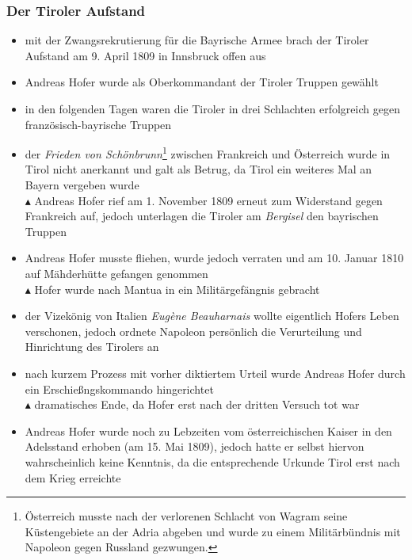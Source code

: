 \documentclass[11pt,a4paper]{article}
\begin{document}
\subsubsection*{\color{bluecolor} Der Tiroler Aufstand}

\begin{itemize}

\item mit der Zwangsrekrutierung für die Bayrische Armee brach der Tiroler Aufstand am 9. April 1809 in Innsbruck offen aus

\item Andreas Hofer wurde als Oberkommandant der Tiroler Truppen gewählt

\item in den folgenden Tagen waren die Tiroler in drei Schlachten erfolgreich gegen französisch-bayrische Truppen

\item der \emph{Frieden von Schönbrunn}\footnote{Österreich musste nach der verlorenen Schlacht von Wagram seine Küstengebiete an der Adria abgeben und wurde zu einem Militärbündnis mit Napoleon gegen Russland gezwungen.} zwischen Frankreich und Österreich wurde in Tirol nicht anerkannt und galt als Betrug, da Tirol ein weiteres Mal an Bayern vergeben wurde\\
	$\blacktriangle$ Andreas Hofer rief am 1. November 1809 erneut zum Widerstand gegen Frankreich auf, jedoch unterlagen die Tiroler am \textsl{Bergisel} den bayrischen Truppen

\item Andreas Hofer musste fliehen, wurde jedoch verraten und am 10. Januar 1810 auf Mähderhütte gefangen genommen\\
	$\blacktriangle$ Hofer wurde nach Mantua in ein Militärgefängnis gebracht

\item der Vizekönig von Italien \textsl{Eugène Beauharnais} wollte eigentlich Hofers Leben verschonen, jedoch ordnete Napoleon persönlich die Verurteilung und Hinrichtung des Tirolers an

\item nach kurzem Prozess mit vorher diktiertem Urteil wurde Andreas Hofer durch ein Erschießngskommando hingerichtet\\
	$\blacktriangle$ dramatisches Ende, da Hofer erst nach der dritten Versuch tot war

\item Andreas Hofer wurde noch zu Lebzeiten vom österreichischen Kaiser in den Adelsstand erhoben (am 15. Mai 1809), jedoch hatte er selbst hiervon wahrscheinlich keine Kenntnis, da die entsprechende Urkunde Tirol erst nach dem Krieg erreichte


\end{itemize}
\end{document}
